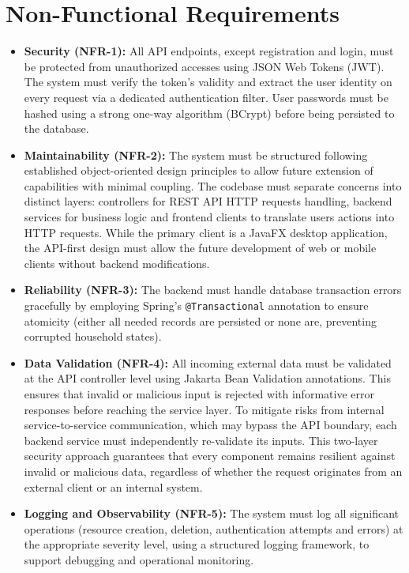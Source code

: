 \section{Non-Functional Requirements}
\begin{itemize}
    \item \textbf{Security (NFR-1):} All API endpoints, except registration and login, must be protected from unauthorized accesses using JSON Web Tokens (JWT). The system must verify the token's validity and extract the user identity on every request via a dedicated authentication filter. User passwords must be hashed using a strong one-way algorithm (BCrypt) before being persisted to the database.
    \item \textbf{Maintainability (NFR-2):} The system must be structured following established object-oriented design principles to allow future extension of capabilities with minimal coupling. The codebase must separate concerns into distinct layers: controllers for REST API HTTP requests handling, backend services for business logic and frontend clients to translate users actions into HTTP requests. While the primary client is a JavaFX desktop application, the API-first design must allow the future development of web or mobile clients without backend modifications.
    \item \textbf{Reliability (NFR-3):} The backend must handle database transaction errors gracefully by employing Spring's \texttt{@Transactional} annotation to ensure atomicity (either all needed records are persisted or none are, preventing corrupted household states).
    \item \textbf{Data Validation (NFR-4):} All incoming external data must be validated at the API controller level using Jakarta Bean Validation annotations. This ensures that invalid or malicious input is rejected with informative error responses before reaching the service layer. To mitigate risks from internal service-to-service communication, which may bypass the API boundary, each backend service must independently re-validate its inputs. This two-layer security approach guarantees that every component remains resilient against invalid or malicious data, regardless of whether the request originates from an external client or an internal system.
    \item \textbf{Logging and Observability (NFR-5):} The system must log all significant operations (resource creation, deletion, authentication attempts and errors) at the appropriate severity level, using a structured logging framework, to support debugging and operational monitoring.
\end{itemize}

